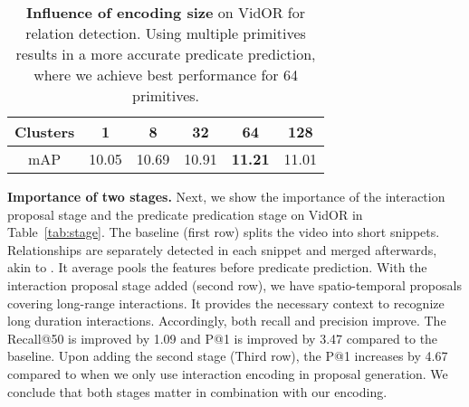 \documentclass[10pt,twocolumn,letterpaper]{article}
\begin{document}
\begin{table}[t]
\centering
\begin{tabular}{cccccc}
\toprule
 Clusters  & 1 & 8 & 32 & 64 & 128 \\
\midrule
mAP & 10.05 & 10.69 & 10.91 & \textbf{11.21} & 11.01 \\
\bottomrule
\end{tabular}
\caption{\textbf{Influence of encoding size} on VidOR for relation detection. Using multiple primitives results in a more accurate predicate prediction, where we achieve best performance for 64 primitives.}
\label{tab:iter}
\end{table}


\textbf{Importance of two stages.}
Next, we show the importance of the interaction proposal stage and the predicate predication stage on VidOR in Table~\ref{tab:stage}. 
The baseline (first row) splits the video into short snippets. Relationships are separately detected in each snippet and merged afterwards, akin to \cite{qian2019video, xie2020video, su2020video}. It average pools the features before predicate prediction. With the interaction proposal stage added (second row), we have spatio-temporal proposals covering long-range interactions. It provides the necessary context to recognize long duration interactions. Accordingly, both recall and precision improve. The Recall@50 is improved by 1.09 and P@1 is improved by 3.47 compared to the baseline. Upon adding the second stage (Third row), the P@1 increases by 4.67 compared to when we only use interaction encoding in proposal generation. We conclude that both stages matter in combination with our encoding.

\begin{table}[t!]
\centering
{}
\caption{\textbf{Importance of two stages} on VidOR. Incorporating Social Fabric into the two stages of our pipeline (third row) is preferred over baselines based on average pooling of features with video snippet proposals (first row) and using Social Fabric only for the proposals (second row).}
\label{tab:stage}
\end{table}
\end{document}
